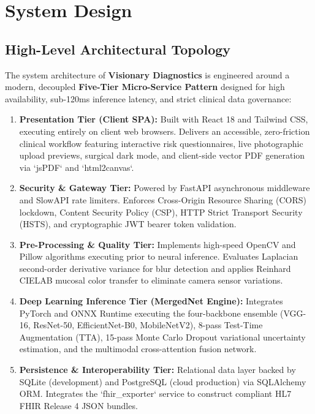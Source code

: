 \documentclass[12pt,a4paper,oneside]{report}
\begin{document}
\chapter{System Design}
\label{ch:system_design}

\section{High-Level Architectural Topology}
\label{sec:high_level_arch}

The system architecture of \textbf{Visionary Diagnostics} is engineered around a modern, decoupled \textbf{Five-Tier Micro-Service Pattern} designed for high availability, sub-120ms inference latency, and strict clinical data governance:

\begin{enumerate}[label=\arabic*.]
    \item \textbf{Presentation Tier (Client SPA):} Built with React 18 and Tailwind CSS, executing entirely on client web browsers. Delivers an accessible, zero-friction clinical workflow featuring interactive risk questionnaires, live photographic upload previews, surgical dark mode, and client-side vector PDF generation via `jsPDF` and `html2canvas`.
    
    \item \textbf{Security \& Gateway Tier:} Powered by FastAPI asynchronous middleware and SlowAPI rate limiters. Enforces Cross-Origin Resource Sharing (CORS) lockdown, Content Security Policy (CSP), HTTP Strict Transport Security (HSTS), and cryptographic JWT bearer token validation.
    
    \item \textbf{Pre-Processing \& Quality Tier:} Implements high-speed OpenCV and Pillow algorithms executing prior to neural inference. Evaluates Laplacian second-order derivative variance for blur detection and applies Reinhard CIELAB mucosal color transfer to eliminate camera sensor variations.
    
    \item \textbf{Deep Learning Inference Tier (MergedNet Engine):} Integrates PyTorch and ONNX Runtime executing the four-backbone ensemble (VGG-16, ResNet-50, EfficientNet-B0, MobileNetV2), 8-pass Test-Time Augmentation (TTA), 15-pass Monte Carlo Dropout variational uncertainty estimation, and the multimodal cross-attention fusion network.
    
    \item \textbf{Persistence \& Interoperability Tier:} Relational data layer backed by SQLite (development) and PostgreSQL (cloud production) via SQLAlchemy ORM. Integrates the `fhir_exporter` service to construct compliant HL7 FHIR Release 4 JSON bundles.
\end{enumerate}
\end{document}
